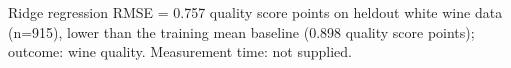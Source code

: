 \documentclass{article}
\begin{document}
Ridge regression RMSE = 0.757 quality score points on heldout white wine data (n=915), lower than the training mean baseline (0.898 quality score points); outcome: wine quality. Measurement time: not supplied.
\end{document}
